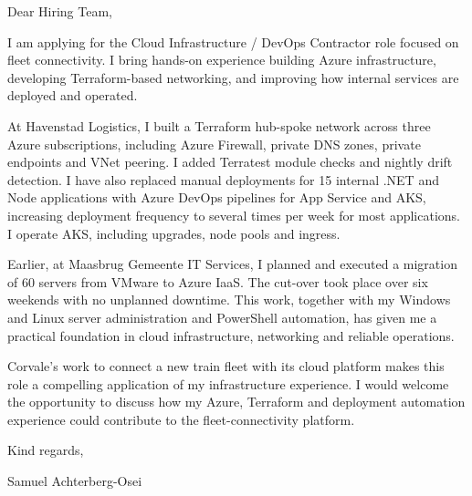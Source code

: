 \documentclass[11pt,a4paper]{article}
\begin{document}
Dear Hiring Team,

I am applying for the Cloud Infrastructure / DevOps Contractor role focused on fleet connectivity. I bring hands-on experience building Azure infrastructure, developing Terraform-based networking, and improving how internal services are deployed and operated.

At Havenstad Logistics, I built a Terraform hub-spoke network across three Azure subscriptions, including Azure Firewall, private DNS zones, private endpoints and VNet peering. I added Terratest module checks and nightly drift detection. I have also replaced manual deployments for 15 internal .NET and Node applications with Azure DevOps pipelines for App Service and AKS, increasing deployment frequency to several times per week for most applications. I operate AKS, including upgrades, node pools and ingress.

Earlier, at Maasbrug Gemeente IT Services, I planned and executed a migration of 60 servers from VMware to Azure IaaS. The cut-over took place over six weekends with no unplanned downtime. This work, together with my Windows and Linux server administration and PowerShell automation, has given me a practical foundation in cloud infrastructure, networking and reliable operations.

Corvale's work to connect a new train fleet with its cloud platform makes this role a compelling application of my infrastructure experience. I would welcome the opportunity to discuss how my Azure, Terraform and deployment automation experience could contribute to the fleet-connectivity platform.

Kind regards,

Samuel Achterberg-Osei
\end{document}
